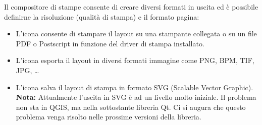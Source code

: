 Il compositore di stampe consente di creare diversi formati in uscita ed è
possibile definirne la risoluzione (qualità di stampa) e il formato pagina:

\begin{itemize}
\item L'icona  consente di stampare il
layout su una stampante collegata o su un file PDF o Postscript in funzione
del driver di stampa installato.
\item L'icona 
esporta il layout in diversi formati immagine come PNG, BPM, TIF, JPG, \dots
\item L'icona  salva il layout
di stampa in formato SVG (Scalable Vector Graphic). \textbf{Nota:} Attualmente
l'uscita in SVG è ad un livello molto iniziale. Il problema non sta in QGIS,
ma nella sottostante libreria Qt. Ci si augura che questo problema venga
risolto nelle prossime versioni della libreria.
\end{itemize}

